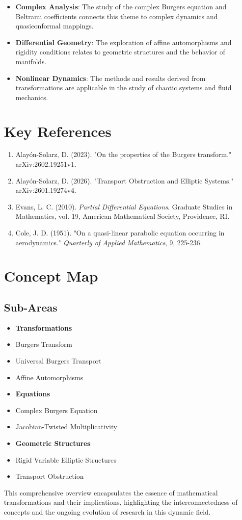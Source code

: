 \documentclass[11pt,a4paper]{article}
\begin{document}
\begin{itemize}
\item \textbf{Complex Analysis}: The study of the complex Burgers equation and Beltrami coefficients connects this theme to complex dynamics and quasiconformal mappings.
\item \textbf{Differential Geometry}: The exploration of affine automorphisms and rigidity conditions relates to geometric structures and the behavior of manifolds.
\item \textbf{Nonlinear Dynamics}: The methods and results derived from transformations are applicable in the study of chaotic systems and fluid mechanics.
\end{itemize}

\section{Key References}

\begin{enumerate}
\item Alayón-Solarz, D. (2023). "On the properties of the Burgers transform." arXiv:2602.19251v1.
\item Alayón-Solarz, D. (2026). "Transport Obstruction and Elliptic Systems." arXiv:2601.19274v4.
\item Evans, L. C. (2010). \textit{Partial Differential Equations}. Graduate Studies in Mathematics, vol. 19, American Mathematical Society, Providence, RI.
\item Cole, J. D. (1951). "On a quasi-linear parabolic equation occurring in aerodynamics." \textit{Quarterly of Applied Mathematics}, 9, 225-236.
\end{enumerate}

\section{Concept Map}

\subsection{Sub-Areas}

\begin{itemize}
\item \textbf{Transformations}
\item Burgers Transform
\item Universal Burgers Transport
\item Affine Automorphisms
\item \textbf{Equations}
\item Complex Burgers Equation
\item Jacobian-Twisted Multiplicativity
\item \textbf{Geometric Structures}
\item Rigid Variable Elliptic Structures
\item Transport Obstruction
\end{itemize}

This comprehensive overview encapsulates the essence of mathematical transformations and their implications, highlighting the interconnectedness of concepts and the ongoing evolution of research in this dynamic field.
\end{document}
